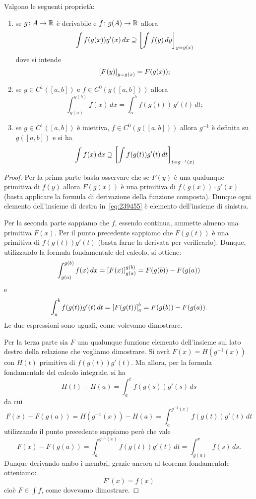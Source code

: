 \begin{theorem}
Valgono le seguenti proprietà:
\begin{enumerate}
\item
se $g\colon A \to \mathbb R$ è derivabile e $f\colon g(A) \to \mathbb R$
allora
\[
  \int f(g(x)) g'(x)\, dx \supseteq
  {\left[ \int f(y) \, dy \right]}_{y=g(x)}
\]
dove si intende
\[
 {\left[ F(y) \right]}_{y=g(x)} = F(g(x));
\]

\item
se $g\in C^1([a,b])$ e $f\in C^0(g([a,b]))$ allora
\[
 \int_{g(a)}^{g(b)} f(x)\, dx = \int_a^b f(g(t))\, g'(t)\, dt;
\]

\item
se $g\in C^1([a,b])$ è iniettiva, $f\in C^0(g([a,b]))$
allora $g^{-1}$ è definita su $g([a,b])$
e si ha
\begin{equation}\label{eq:239455}
  \int f(x)\, dx \supseteq {\left[ \int f(g(t)) g'(t)\, dt \right]}_{t=g^{-1}(x)}
\end{equation}
\end{enumerate}
\end{theorem}
%
\begin{proof}
Per la prima parte 
basta osservare che se $F(y)$ è una qualunque primitiva di $f(y)$ 
allora $F(g(x))$ è una primitiva di $f(g(x))\cdot g'(x)$
(basta applicare la formula di derivazione della funzione composta).
Dunque ogni elemento dell'insieme di destra in~\eqref{eq:239455}
è elemento dell'insieme di sinistra.

Per la seconda parte sappiamo che $f$, essendo continua, ammette almeno una
primitiva $F(x)$. Per il punto precedente sappiamo che $F(g(t))$ è una
primitiva di $f(g(t))g'(t)$ (basta farne la derivata per verificarlo).
Dunque, utilizzando la formula fondamentale del calcolo, si ottiene:
\[
\int_{g(a)}^{g(b)} f(x) \, dx
= {\left[ F(x) \right]}_{g(a)}^{g(b)}
= F(g(b)) - F(g(a))
\]
e
\[
\int_a^b f(g(t))g'(t)\, dt
= {\left[ F(g(t)) \right]}_a^b
= F(g(b)) - F(g(a)).
\]
Le due espressioni sono uguali, come volevamo dimostrare.

Per la terza parte
sia $F$ una qualunque funzione elemento dell'insieme sul lato destro della
relazione che vogliamo dimostrare.
Si avrà $F(x) = H(g^{-1}(x))$ con $H(t)$ primitiva
di $f(g(t))g'(t)$. Ma allora, per la formula fondamentale del calcolo integrale,
si ha
\[
  H(t)-H(a) = \int_a^t f(g(s)) g'(s)\, ds
\]
da cui
\[
  F(x) - F(g(a))
  = H(g^{-1}(x)) - H(a)
  = \int_a^{g^{-1}(x)} f(g(t)) g'(t)\, dt
\]
utilizzando il punto precedente sappiamo però che vale
\[
F(x) - F(g(a)) =
\int_a^{g^{-1}(x)} f(g(t)) g'(t)\, dt
= \int_{g(a)}^x f(s)\, ds.
\]
Dunque derivando ambo i membri, grazie ancora al teorema
fondamentale otteniamo:
\[
  F'(x) = f(x)
\]
cioè $F\in \int f$, come dovevamo dimostrare.
\end{proof}

